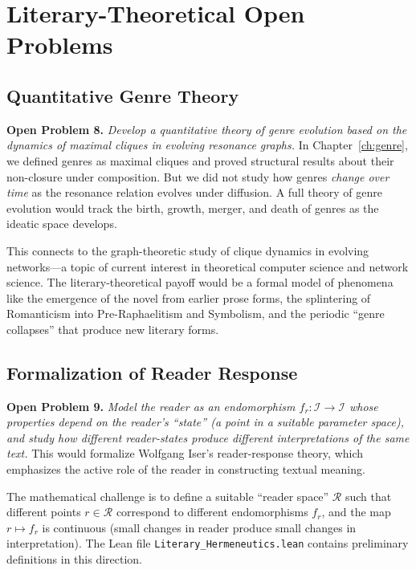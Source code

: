 \documentclass[11pt,openany]{book}
\theoremstyle{definition}
\theoremstyle{plain}
\theoremstyle{remark}
\newcommand{\IS}{\mathcal{I}}               %
\begin{document}
\section{Literary-Theoretical Open Problems}

\subsection{Quantitative Genre Theory}

\textbf{Open Problem 8.} \emph{Develop a quantitative theory of genre evolution based on the dynamics of maximal cliques in evolving resonance graphs.} In Chapter~\ref{ch:genre}, we defined genres as maximal cliques and proved structural results about their non-closure under composition. But we did not study how genres \emph{change over time} as the resonance relation evolves under diffusion. A full theory of genre evolution would track the birth, growth, merger, and death of genres as the ideatic space develops.

This connects to the graph-theoretic study of clique dynamics in evolving networks---a topic of current interest in theoretical computer science and network science. The literary-theoretical payoff would be a formal model of phenomena like the emergence of the novel from earlier prose forms, the splintering of Romanticism into Pre-Raphaelitism and Symbolism, and the periodic ``genre collapses'' that produce new literary forms.

\subsection{Formalization of Reader Response}

\textbf{Open Problem 9.} \emph{Model the reader as an endomorphism $f_r : \IS \to \IS$ whose properties depend on the reader's ``state'' (a point in a suitable parameter space), and study how different reader-states produce different interpretations of the same text.} This would formalize Wolfgang Iser's reader-response theory, which emphasizes the active role of the reader in constructing textual meaning.

The mathematical challenge is to define a suitable ``reader space'' $\mathcal{R}$ such that different points $r \in \mathcal{R}$ correspond to different endomorphisms $f_r$, and the map $r \mapsto f_r$ is continuous (small changes in reader produce small changes in interpretation). The Lean file \texttt{Literary\_Hermeneutics.lean} contains preliminary definitions in this direction.
\end{document}
